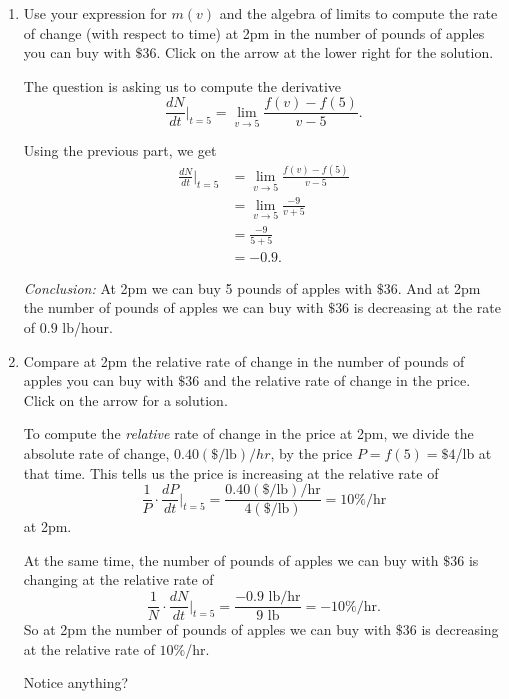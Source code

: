 \documentclass{ximera}
\begin{document}
\begin{question}
\begin{enumerate}
\begin{enumerate}
\begin{expandable}
\end{expandable}

\item Use your expression for $m(v)$ and the algebra of limits to compute the rate of change (with respect to time) at 2pm in the number of pounds of apples you can buy with $\$36$. Click on the arrow at the lower right for the solution.

\begin{expandable}
The question is asking us to compute the derivative
\[
  \frac{dN}{dt}\Big|_{t=5} = \lim_{v\to 5} \frac{f(v)-f(5)}{v-5} .
\]

Using the previous part, we get
\begin{align*}
\frac{dN}{dt}\Big|_{t=5} &= \lim_{v\to 5} \frac{f(v)-f(5)}{v-5} \\
                                    &= \lim_{v\to 5} \frac{-9}{v+5} \\
                                    &= \frac{-9}{5+5} \\
                                   &= -0.9 .
\end{align*}

\emph{Conclusion:} At 2pm we can buy 5 pounds of apples with $\$36$. And at 2pm the number of pounds of apples we can buy with $\$36$ is decreasing at the rate of $0.9$ lb/hour.
\end{expandable}

\item Compare at 2pm the relative rate of change in the number of pounds of apples you can buy with $\$36$ and the relative rate of change in the price. Click on the arrow for a solution.

\begin{expandable}
To compute the \emph{relative} rate of change in the price at 2pm, we divide the absolute rate of change, $0.40(\$/\text{lb})/hr$, by the price $P=f(5) = \$4$/lb at that time. This tells us the price is increasing at the relative rate of 
\[
   \frac{1}{P} \cdot \frac{dP}{dt} \Big|_{t=5} = \frac{0.40(\$/\text{lb})/\text{hr}}{4(\$/\text{lb})} = 10\%/\text{hr}
\]
at 2pm.

At the same time, the number of pounds of apples we can buy with $\$36$ is changing at the relative rate of 
\[
  \frac{1}{N} \cdot \frac{dN}{dt} \Big|_{t=5} = \frac{-0.9 \text{ lb/hr}}{9\text{ lb}} = -10\%/\text{hr} .
\]
So at 2pm the number of pounds of apples we can buy with $\$36$ is decreasing at the relative rate of $10\%$/hr.
\end{expandable}

\begin{freeResponse}
Notice anything?
\end{freeResponse}


\end{enumerate}

\end{enumerate}
\end{question}
\end{document}
